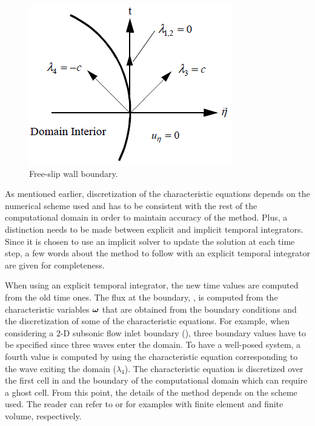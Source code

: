 %
\begin{figure}[H]
\centering
\includegraphics[]{figures/free_slip_wall_bc.png}
\caption{Free-slip wall boundary.\label{fig:wall_bc}}
\end{figure}
%
As mentioned earlier, discretization of the characteristic equations depends on the numerical scheme used and has to be consistent with the rest of the computational domain in order to maintain accuracy of the method. Plus, a distinction needs to be made between explicit and implicit temporal integrators. Since it is chosen to use an implicit solver to update the solution at each time step, a few words about the method to follow with an explicit temporal integrator are given for completeness. 

When using an explicit temporal integrator, the new time values are computed from the old time ones. The flux at the boundary, , is computed from the characteristic variables $\boldsymbol\omega$ that are obtained from the boundary conditions and the discretization of some of the characteristic equations. For example, when considering a $2$-D subsonic flow inlet boundary (), three boundary values have to be specified since three waves enter the domain. To have a well-posed system, a fourth value is computed by using the characteristic equation corresponding to the wave exiting the domain ($\lambda_4$). The characteristic equation is discretized over the first cell in and the boundary of the computational domain which can require a ghost cell. From this point, the details of the method depends on the scheme used. The reader can refer to \cite{RichThesis} or \cite{SEM} for examples with finite element and finite volume, respectively. 

